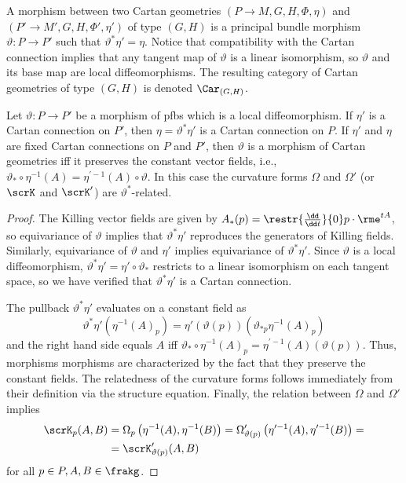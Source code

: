 \begin{defn}
    A morphism between two Cartan geometries $(P\to M,G,H,\Phi,\eta)$ and $(P'\to M',G,H,\Phi',\eta') $ of type $(G,H)$ is a principal bundle morphism $\vartheta:P\to P'$ such that $\vartheta^\ast\eta '=\eta$. Notice that compatibility with the Cartan connection implies that any tangent map of $\vartheta$ is a linear isomorphism, so $\vartheta$ and its base map are local diffeomorphisms. The resulting category of Cartan geometries of type $(G,H)$ is denoted $\Car_{(G,H)}$.
\end{defn}

\begin{lem}\label{lem 1.5.2 Cap}
    Let $\vartheta:P\to P'$ be a morphism of \glspl{pfb} which is a local diffeomorphism. If $\eta'$ is a Cartan connection on $P'$, then $\eta=\vartheta^\ast\eta'$ is a Cartan connection on $P$. If $\eta'$ and $\eta$ are fixed Cartan connections on $P$ and $P'$, then $\vartheta$ is a morphism of Cartan geometries iff it preserves the constant vector fields, i.e., $\vartheta_\ast\circ \eta^{-1}(A)=\eta^{\prime-1}(A)\circ\vartheta$. In this case the curvature forms $\Omega$ and $\Omega'$ (or $\scrK$ and $\scrK'$) are $\vartheta^\ast$-related.
\end{lem}
\begin{proof}
    The Killing vector fields are given by $A_\ast(p)=\restr{\frac{\dd}{\dd t}}{0}p\cdot \rme^{tA}$, so equivariance of $\vartheta$ implies that $\vartheta^\ast \eta'$ reproduces the generators of Killing fields. Similarly, equivariance of $\vartheta$ and $\eta'$ implies equivariance of $\vartheta^\ast\eta'$. Since $\vartheta$ is a local diffeomorphism, $\vartheta^\ast\eta'=\eta'\circ \vartheta_\ast$ restricts to a linear isomorphism on each tangent space, so we have verified that $\vartheta^\ast\eta'$ is a Cartan connection.

    The pullback $\vartheta^\ast\eta'$ evaluates on a constant field as 
    \[\vartheta^\ast\eta'(\eta^{-1}(A)_p)=\eta'(\vartheta(p))\left(\vartheta_{\ast p}\eta^{-1}(A)_p\right)\]
    and the right hand side equals $A$ iff $\vartheta_\ast\circ \eta^{-1}(A)_p=\eta^{\prime-1}(A)(\vartheta(p))$. Thus, morphisms morphisms are characterized by the fact that they preserve the constant fields. The relatedness of the curvature forms follows immediately from their definition via the structure equation. Finally, the relation between $\Omega$ and $\Omega'$ implies 
    \begin{align}
        \scrK_p(A,B)&=\Omega_p\left(\eta^{-1}(A),\eta^{-1}(B)\right)=\Omega'_{\vartheta(p)}\left(\eta^{\prime-1}(A),\eta^{\prime-1}(B)\right)=\notag
        \\&=\scrK'_{\vartheta(p)}(A,B)
    \end{align}
    for all $p\in P, A,B\in\frakg$.
\end{proof}


